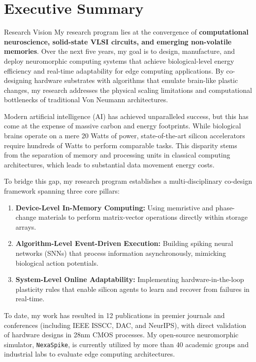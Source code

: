 \section{Executive Summary}

\begin{calloutbox}{Research Vision}
My research program lies at the convergence of \textbf{computational neuroscience, solid-state VLSI circuits, and emerging non-volatile memories}. Over the next five years, my goal is to design, manufacture, and deploy neuromorphic computing systems that achieve biological-level energy efficiency and real-time adaptability for edge computing applications. By co-designing hardware substrates with algorithms that emulate brain-like plastic changes, my research addresses the physical scaling limitations and computational bottlenecks of traditional Von Neumann architectures.
\end{calloutbox}

Modern artificial intelligence (AI) has achieved unparalleled success, but this has come at the expense of massive carbon and energy footprints. While biological brains operate on a mere 20 Watts of power, state-of-the-art silicon accelerators require hundreds of Watts to perform comparable tasks. This disparity stems from the separation of memory and processing units in classical computing architectures, which leads to substantial data movement energy costs. 

To bridge this gap, my research program establishes a multi-disciplinary co-design framework spanning three core pillars:
\begin{enumerate}
    \item \textbf{Device-Level In-Memory Computing:} Using memristive and phase-change materials to perform matrix-vector operations directly within storage arrays.
    \item \textbf{Algorithm-Level Event-Driven Execution:} Building spiking neural networks (SNNs) that process information asynchronously, mimicking biological action potentials.
    \item \textbf{System-Level Online Adaptability:} Implementing hardware-in-the-loop plasticity rules that enable silicon agents to learn and recover from failures in real-time.
\end{enumerate}

To date, my work has resulted in 12 publications in premier journals and conferences (including IEEE ISSCC, DAC, and NeurIPS), with direct validation of hardware designs in 28nm CMOS processes. My open-source neuromorphic simulator, \texttt{NexaSpike}, is currently utilized by more than 40 academic groups and industrial labs to evaluate edge computing architectures.
